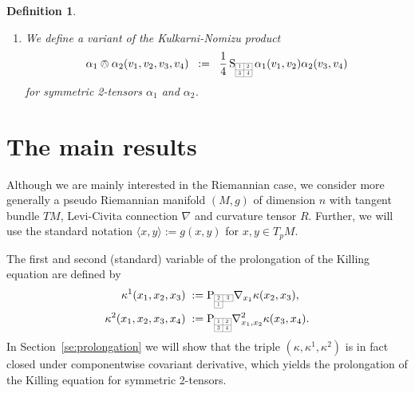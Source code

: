 \documentclass[11pt,a4paper]{article}
\theoremstyle{plain}
\newtheorem{definition}{Definition}
\theoremstyle{remark}
\newcommand{\rmP}{\mathrm{P}}
\newcommand{\rmS}{\mathrm{S}}
\begin{document}
\begin{definition}
\begin{enumerate}
\begin{equation}
{{\begin{array}{|c|c|}
\cline{1-2}
3 & 4\\
\cline{1-2} 
\end{array}}{12pt}}\, \lambda(v_1)\beta(v_2,v_3,v_4).
\end{equation}
\item 
We define a variant of the Kulkarni-Nomizu product
\begin{equation}\label{eq:def_Kulkarni_Nomizu_product}
\alpha_1\owedge \alpha_2(v_1,v_2,v_3,v_4)\;\;:=\;\;\frac{1}{4}\,\rmS_{\scaleto{\begin{array}{|c|c|}
\cline{1-2}
1 & 2 \\
\cline{1-2}
3 & 4\\
\cline{1-2} 
\end{array}}{12pt}}\, \alpha_1(v_1,v_2)\alpha_2(v_3,v_4)
\end{equation}
for symmetric 2-tensors $\alpha_1$ and $\alpha_2$.
\end{enumerate}
\end{definition}


\section{The main results}
Although we are mainly interested in the Riemannian case, we consider more
generally a pseudo Riemannian manifold $(M,g)$ of dimension $n$ with tangent
bundle $TM$, Levi-Civita connection $\nabla$ and curvature tensor
$R$. Further, we will use the standard notation $\langle x,y\rangle := g(x,y)$ for $x,y\in T_pM$.

The first and second (standard) variable of the prolongation of the Killing equation are defined by
\begin{align}\label{eq:kappa_prolong_1}
\kappa^1(x_1,x_2,x_3) \;:=\; & \rmP_{\scaleto{
\begin{array}{|c|c|}
\cline{1-2} 
2 & 3 \\
\cline{1-2}
1 & \multicolumn{1}{c}{\;\;\;}\\ 
\cline{1-1}
\end{array}}{12pt}} \nabla_{x_1}\kappa(x_2,x_3),\\
\label{eq:kappa_prolong_2}
\kappa^2(x_1,x_2,x_3,x_4) \;:=\; & \rmP_{\scaleto{\begin{array}{|c|c|}\cline{1-2}
1 & 2 \\
\cline{1-2}
3  & 4\\
\cline{1-2} 
\end{array}}{12pt}}\nabla^2_{x_1,x_2}\kappa(x_3,x_4).
\end{align}
In Section~\ref{se:prolongation} we will show that the triple $(\kappa,\kappa^1,\kappa^2)$ is in fact closed under componentwise covariant derivative, 
which yields the prolongation of the Killing equation for symmetric 2-tensors.
\end{document}
